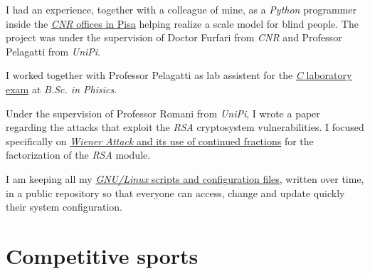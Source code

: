 \documentclass[10pt]{article} %
\begin{document}
I had an experience, together with a colleague of mine, as a \textit{Python} programmer inside the \href{http://www.area.pi.cnr.it/}{\textit{CNR} offices in Pisa} helping realize a scale model for blind people. The project was under the supervision of Doctor Furfari from \textit{CNR} and Professor Pelagatti from \textit{UniPi}.

\medskip
I worked together with Professor Pelagatti as lab assistent for the \href{http://didawiki.di.unipi.it/doku.php/fisica/informatica/201617/start}{\textit{C} laboratory exam} at \textit{B.Sc. in Phisics}.

\medskip
Under the supervision of Professor Romani from \textit{UniPi}, I wrote a paper regarding the attacks that exploit the \textit{RSA} cryptosystem vulnerabilities. I focused specifically on \href{https://www.geoteo.net/attack.html}{\textit{Wiener Attack} and its use of continued fractions} for the factorization of the \textit{RSA} module.

\medskip
I am keeping all my \href{https://www.geoteo.net/config.html}{\textit{GNU/Linux} scripts and configuration files}, written over time, in a public repository so that everyone can access, change and update quickly their system configuration.



\vspace{15pt}
\section{Competitive sports}
\end{document}
